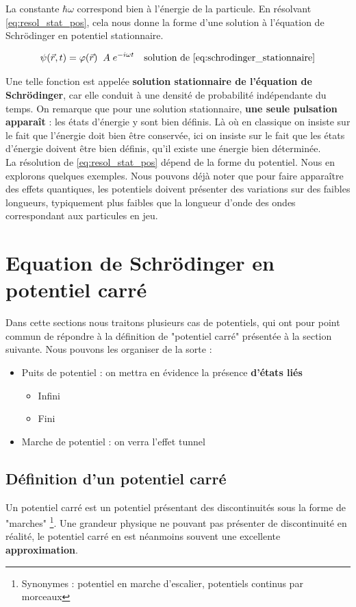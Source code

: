 La constante $\hbar \omega$ correspond bien à l'énergie de la particule. En résolvant \eqref{eq:resol_stat_pos}, cela nous donne la forme d'une solution à l'équation de Schrödinger en potentiel stationnaire.

\begin{equation}
\psi(\vec r, t) = \varphi(\vec r) \; \;  A \;e^{-i\omega t} \quad \text{solution de \eqref{eq:schrodinger_stationnaire}}
\end{equation}


Une telle fonction est appelée \textbf{solution stationnaire de l'équation de Schrödinger}, car elle conduit à une densité de probabilité indépendante du temps. On remarque que pour une solution stationnaire, \textbf{une seule pulsation apparaît} : les états d'énergie y sont bien définis. Là où en classique on insiste sur le fait que l'énergie doit bien être conservée, ici on insiste sur le fait que les états d'énergie doivent être bien définis, qu'il existe une énergie bien déterminée. \\

La résolution de \eqref{eq:resol_stat_pos} dépend de la forme du potentiel. Nous en explorons quelques exemples. Nous pouvons déjà noter que pour faire apparaître des effets quantiques, les potentiels doivent présenter des variations sur des faibles longueurs, typiquement plus faibles que la longueur d'onde des ondes correspondant aux particules en jeu.


\section{Equation de Schrödinger en potentiel carré}
Dans cette sections nous traitons plusieurs cas de potentiels, qui ont pour point commun de répondre à la définition de "potentiel carré" présentée à la section suivante. Nous pouvons les organiser de la sorte :
\begin{itemize}
  \item Puits de potentiel : on mettra en évidence la présence \textbf{d'états liés}
    \begin{itemize}[label = $\star$]
      \item Infini
      \item Fini
    \end{itemize}
  \item Marche de potentiel : on verra l'effet tunnel
\end{itemize}
\subsection{Définition d'un potentiel carré} \label{ch2-subsection-Definition_pot_carre}
Un potentiel carré est un potentiel présentant des discontinuités sous la forme de "marches" \footnote{Synonymes : potentiel en marche d'escalier, potentiels continus par morceaux}. Une grandeur physique ne pouvant pas présenter de discontinuité en réalité, le potentiel carré en est néanmoins souvent une excellente \textbf{approximation}.

